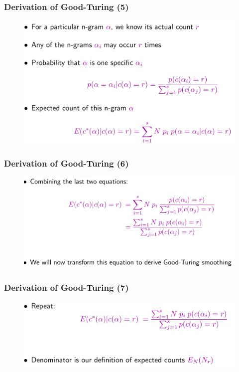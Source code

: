 \documentclass{beamer}
\begin{document}
\begin{frame}\frametitle{Derivation of Good-Turing (5)}
\begin{figure}
\includegraphics[width=0.9\linewidth]{figure/derivation_good_turing_5.pdf}
\end{figure}
\end{frame}


\begin{frame}\frametitle{Derivation of Good-Turing (6)}
\begin{figure}
\includegraphics[width=0.9\linewidth]{figure/derivation_good_turing_6.pdf}
\end{figure}
\end{frame}


\begin{frame}\frametitle{Derivation of Good-Turing (7)}
\begin{figure}
\includegraphics[width=0.9\linewidth]{figure/derivation_good_turing_7.pdf}
\end{figure}
\end{frame}
\end{document}

